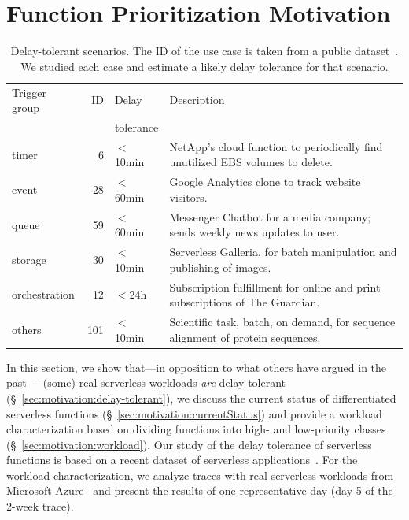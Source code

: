 \label{sec:motivation}

\section{Function Prioritization Motivation}

\begin{table}
  \caption{Delay-tolerant scenarios. The ID of the use case is taken from a public dataset~\cite{Eismann:zenodo:2021:dataset}. We studied each case and estimate a likely delay tolerance for that scenario.}
  \label{tab:examples}
  \centering
  \begin{tabular}{lrll}
    \toprule
    Trigger group & ID & Delay     & Description \\
                  &    & tolerance & \\
    \midrule
    timer & 6 & $<$10min & NetApp's cloud function to periodically find unutilized EBS volumes to delete. \\
    event & 28 & $<$60min & Google Analytics clone to track website visitors. \\ %
    queue & 59 & $<$60min & Messenger Chatbot for a media company; sends weekly news updates to user. \\
    storage & 30 & $<$10min & Serverless Galleria, for batch manipulation and publishing of images. \\
    orchestration & 12 & $<$24h & Subscription fulfillment for online and print subscriptions of The Guardian. \\
    others & 101 & $<$10min & Scientific task, batch, on demand, for sequence alignment of protein sequences. \\
  \bottomrule
\end{tabular}
\end{table}

In this section, we show that---in opposition to what others have argued in the past~\cite{Wiesner:Middleware:2021:TemporalShifting}---(some) real serverless workloads \emph{are} delay tolerant (\S~\ref{sec:motivation:delay-tolerant}), we discuss the current status of differentiated serverless functions (\S~\ref{sec:motivation:currentStatus}) and provide a workload characterization based on dividing functions into high- and low-priority classes (\S~\ref{sec:motivation:workload}).
Our study of the delay tolerance of serverless functions is based on a recent dataset of serverless applications~\cite{Eismann:Software:2021:Why,Eismann:TSE:2021:CommunityConsensus}.
For the workload characterization, we analyze traces with real serverless workloads from Microsoft Azure~\cite{Shahrad:ATC:2020:ServerlessInTheWild} and present the results of one representative day (day 5 of the 2-week trace).

